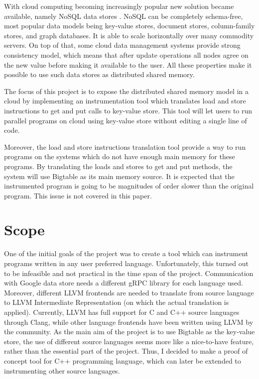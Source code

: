 \documentclass[bsc,frontabs,twoside,singlespacing,parskip,deptreport]{infthesis}     %
\begin{document}
With cloud computing becoming increasingly popular new solution became available, namely NoSQL data stores \citep{nosql-data-stores}. NoSQL can be completely schema-free, most popular data models being key-value stores, document stores, column-family stores, and graph databases. It is able to scale horizontally over many commodity servers. On top of that, some cloud data management systems provide strong consistency model, which means that after update operations all nodes agree on the new value before making it available to the user. All these properties make it possible to use such data stores as distributed shared memory.

The focus of this project is to expose the distributed shared memory model in a cloud by implementing an instrumentation tool which translates load and store instructions to get and put calls to key-value store. This tool will let users to run parallel programs on cloud using key-value store without editing a single line of code.

Moreover, the load and store instructions translation tool provide a way to run programs on the systems which do not have enough main memory for these programs. By translating the loads and stores to get and put methods, the system will use Bigtable as its main memory source. It is expected that the instrumented program is going to be magnitudes of order slower than the original program. This issue is not covered in this paper.

\section{Scope}

One of the initial goals of the project was to create a tool which can instrument programs written in any user preferred language. Unfortunately, this turned out to be infeasible and not practical in the time span of the project. Communication with Google data store needs a different  gRPC library for each language used. Moreover, different LLVM frontends are needed to translate from source language to LLVM Intermediate Representation (on which the actual translation is applied). Currently, LLVM has full support for C and C++ source languages through Clang, while other language frontends have been written using LLVM by the community. As the main aim of the project is to use Bigtable as the key-value store, the use of different source languages seems more like a nice-to-have feature, rather than the essential part of the project. Thus, I decided to make a proof of concept tool for C++ programming language, which can later be extended to instrumenting other source languages. 
\end{document}
